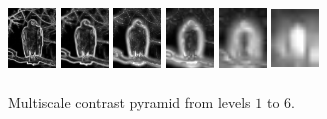 \documentclass[10pt,twocolumn,letterpaper]{article}
\begin{document}
\begin{figure}[b]
\begin{center} 
  \includegraphics[width=0.5in,height=0.75in]{./Figures/pyramid/5_145_145839_p0.jpg} 
 \includegraphics[width=0.5in,height=0.75in]{./Figures/pyramid/5_145_145839_p1.jpg} 
\includegraphics[width=0.5in,height=0.75in]{./Figures/pyramid/5_145_145839_p2.jpg} 
\includegraphics[width=0.5in,height=0.75in]{./Figures/pyramid/5_145_145839_p3.jpg} 
 \includegraphics[width=0.5in,height=0.75in]{./Figures/pyramid/5_145_145839_p4.jpg} 
 \includegraphics[width=0.5in,height=0.75in]{./Figures/pyramid/5_145_145839_p5.jpg}
 \caption{Multiscale contrast pyramid from levels $1$ to $6$.}
\end{center}
\end{figure}
\end{document}

